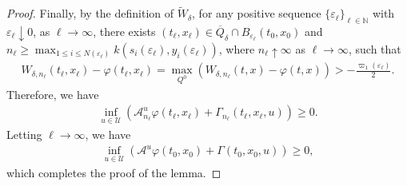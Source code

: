 \documentclass[amscd,amssymb,11pt]{article}
\numberwithin{theorem}{section}
\numberwithin{equation}{section}
\begin{document}
\begin{proof}
Finally, by the definition of $\widetilde{W}_{\delta}$, for any positive sequence $\{\varepsilon_{\ell}\}_{\ell\in\mathbb{N}}$ with $\varepsilon_{\ell}\downarrow 0$, as $\ell\rightarrow\infty$, there exists $(t_{\ell},x_{\ell})\in\overline{Q}_{\delta}\cap B_{\varepsilon_{\ell}}(t_{0},x_{0})$ and $n_{\ell}\geq\max_{1\leq i\leq N(\varepsilon_{\ell})}k(s_{i}(\varepsilon_{\ell}),y_{i}(\varepsilon_{\ell}))$, where $n_{\ell}\uparrow\infty$ as $\ell\rightarrow\infty$, such that
\begin{align*}
W_{\delta,n_{\ell}}(t_{\ell},x_{\ell})-\varphi(t_{\ell},x_{\ell})=\max_{Q^{0}}\left(W_{\delta,n_{\ell}}(t,x)-\varphi(t,x)\right)> -\frac{\varpi_{1}(\varepsilon_{\ell})}{2}.
\end{align*}
Therefore, we have
\begin{align*}
\inf_{u\in\mathcal{U}}\left(\mathscr{A}_{n_{\ell}}^{u}\varphi(t_{\ell},x_{\ell})+\Gamma_{n_{\ell}}(t_{\ell},x_{\ell},u)\right)\geq 0.
\end{align*}
Letting $\ell\rightarrow\infty$, we have
\begin{align*}
\inf_{u\in\mathcal{U}}\left(\mathscr{A}^{u}\varphi(t_{0},x_{0})+\Gamma(t_{0},x_{0},u)\right)\geq 0,
\end{align*}
which completes the proof of the lemma.
\end{proof}
\end{document}
